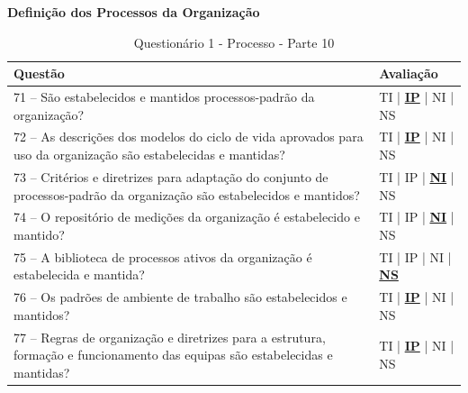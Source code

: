 \documentclass[openany,10pt,a4paper]{article}
\begin{document}
\begin{appendix}
	\begin{table}[h]
	\textbf{Definição dos Processos da Organização}
		\centering
		\caption{Questionário 1 - Processo - Parte 10}
		\begin{tabular}{p{5in}p{1in}}		
			\toprule
			\textbf{Questão}  & \textbf{Avaliação}\\ 
			\midrule
			71 – São estabelecidos e mantidos processos-padrão da organização?
	 & TI | \underline{\textbf{IP}} | NI | NS \\
			\midrule
			72 – As descrições dos modelos do ciclo de vida aprovados para uso da organização são 
	estabelecidas e mantidas?
	 & TI | \underline{\textbf{IP}} | NI | NS \\
			\midrule
			73 – Critérios e diretrizes para adaptação do conjunto de processos-padrão da organização são 
	estabelecidos e mantidos?
	 & TI | IP | \underline{\textbf{NI}} | NS \\
			\midrule
			74 – O repositório de medições da organização é estabelecido e mantido?
	 & TI | IP | \underline{\textbf{NI}} | NS \\
			\midrule
			75 – A biblioteca de processos ativos da organização é estabelecida e mantida?
	  & TI | IP | NI | \underline{\textbf{NS}} \\
			\midrule
			76 – Os padrões de ambiente de trabalho são estabelecidos e mantidos?
	 & TI | \underline{\textbf{IP}} | NI | NS \\
			\midrule
			77 – Regras de organização e diretrizes para a estrutura, formação e funcionamento das equipas 
	são estabelecidas e mantidas?
	& TI | \underline{\textbf{IP}} | NI | NS \\
			\bottomrule
		\end{tabular} 
	\end{table}
	

\end{appendix}
\end{document}
